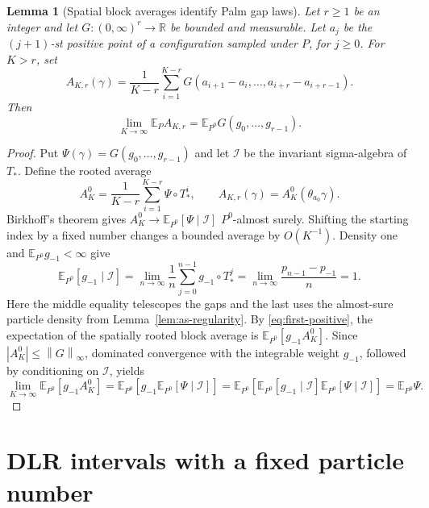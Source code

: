 \documentclass[11pt,reqno]{amsart}
\numberwithin{equation}{section}
\newtheorem{lemma}[theorem]{Lemma}
\theoremstyle{definition}
\theoremstyle{remark}
\newcommand{\R}{\mathbb R}
\newcommand{\E}{\mathbb E}
\newcommand{\1}{\mathbf 1}
\newcommand{\calI}{\mathcal I}
\newcommand{\norm}[1]{\left\lVert #1\right\rVert}
\begin{document}
\begin{samepage}
\begin{lemma}[Spatial block averages identify Palm gap laws]
\label{lem:identify}
Let $r\ge1$ be an integer and let $G:(0,\infty)^r\to\R$ be bounded
and measurable. Let $a_j$ be the $(j+1)$-st positive point of a
configuration sampled under $P$, for $j\ge0$. For $K>r$, set
\begin{equation}\label{eq:spatial-gap-average}
A_{K,r}(\gamma)=\frac1{K-r}\sum_{i=1}^{K-r}
G(a_{i+1}-a_i,\ldots,a_{i+r}-a_{i+r-1}).
\end{equation}
Then
\begin{equation}\label{eq:spatial-palm-limit}
\lim_{K\to\infty}\E_PA_{K,r}
 =\E_{P^0}G(g_0,\ldots,g_{r-1}).
\end{equation}
\end{lemma}
\end{samepage}

\begin{proof}
Put $\Psi(\gamma)=G(g_0,\ldots,g_{r-1})$ and let $\calI$ be the
invariant sigma-algebra of $T_*$. Define the rooted average
\[
A_K^0=\frac1{K-r}\sum_{i=1}^{K-r}\Psi\circ T_*^i,
\qquad A_{K,r}(\gamma)=A_K^0(\theta_{a_0}\gamma).
\]
Birkhoff's theorem gives
$A_K^0\to\E_{P^0}[\Psi\mid\calI]$ $P^0$-almost surely. Shifting the
starting index by a fixed number changes a bounded average by $O(K^{-1})$.
Density one and $\E_{P^0}g_{-1}<\infty$ give
\[
\E_{P^0}[g_{-1}\mid\calI]
=\lim_{n\to\infty}\frac1n\sum_{j=0}^{n-1}g_{-1}\circ T_*^j
=\lim_{n\to\infty}\frac{p_{n-1}-p_{-1}}n=1.
\]
Here the middle equality telescopes the gaps and the last uses the
almost-sure particle density from Lemma~\ref{lem:as-regularity}.
By \eqref{eq:first-positive}, the expectation of the spatially rooted
block average is $\E_{P^0}[g_{-1}A_K^0]$. Since
$|A_K^0|\le\norm G_\infty$, dominated convergence with the integrable
weight $g_{-1}$, followed by conditioning on $\calI$, yields
\[
\lim_{K\to\infty}\E_{P^0}[g_{-1}A_K^0]
=\E_{P^0}\!\left[g_{-1}\E_{P^0}[\Psi\mid\calI]\right]
=\E_{P^0}\!\left[\E_{P^0}[g_{-1}\mid\calI]
                         \E_{P^0}[\Psi\mid\calI]\right]
=\E_{P^0}\Psi.
\]
\end{proof}

\section{DLR intervals with a fixed particle number}\label{sec:blocks}
\end{document}
